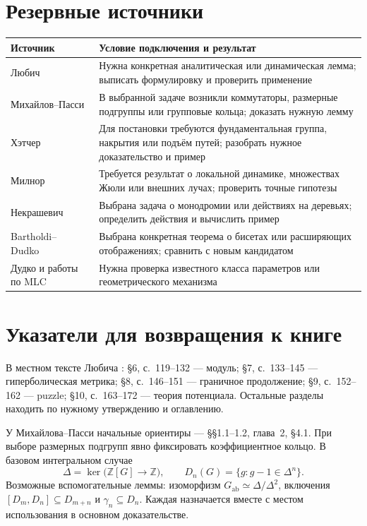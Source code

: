 \section{Резервные источники}
\begin{center}\small
\begin{tabularx}{\textwidth}{@{}P{0.22\textwidth}Y@{}}
\toprule
Источник & Условие подключения и результат\\
\midrule
Любич~\cite{LyubichBook} & Нужна конкретная аналитическая или динамическая
лемма; выписать формулировку и проверить применение\\
Михайлов--Пасси~\cite{MP} & В выбранной задаче возникли коммутаторы,
размерные подгруппы или групповые кольца; доказать нужную лемму\\
Хэтчер~\cite{Hatcher} & Для постановки требуются фундаментальная группа,
накрытия или подъём путей; разобрать нужное доказательство и пример\\
Милнор~\cite{MilnorThird,MilnorNotes} & Требуется результат о локальной
динамике, множествах Жюли или внешних лучах; проверить точные гипотезы\\
Некрашевич~\cite{NekraIMG,NekraBook} & Выбрана задача о монодромии
или действиях на деревьях; определить действия и вычислить пример\\
Bartholdi--Dudko~\cite{BDI,BDIV} & Выбрана конкретная теорема о бисетах
или расширяющих отображениях; сравнить с новым кандидатом\\
Дудко и работы по MLC~\cite{DudkoSurvey,Satellite,Feigenbaum,KKL} & Нужна
проверка известного класса параметров или геометрического механизма\\
\bottomrule
\end{tabularx}
\end{center}

\section{Указатели для возвращения к книге}
В местном тексте Любича :
§6, с.~119--132 --- модуль; §7, с.~133--145 --- гиперболическая метрика;
§8, с.~146--151 --- граничное продолжение; §9, с.~152--162 --- puzzle;
§10, с.~163--172 --- теория потенциала. Остальные разделы находить
по нужному утверждению и оглавлению.

У Михайлова--Пасси начальные ориентиры --- §§1.1--1.2, глава~2, §4.1.
При выборе размерных подгрупп явно фиксировать коэффициентное кольцо.
В базовом интегральном случае
\[
\Delta=\ker\bigl(\mathbb Z[G]\to\mathbb Z\bigr),\qquad
D_n(G)=\{g:g-1\in\Delta^n\}.
\]
Возможные вспомогательные леммы: изоморфизм
\(G_{\mathrm{ab}}\simeq\Delta/\Delta^2\),
включения \([D_m,D_n]\subseteq D_{m+n}\) и \(\gamma_n\subseteq D_n\).
Каждая назначается вместе с местом использования в основном доказательстве.

